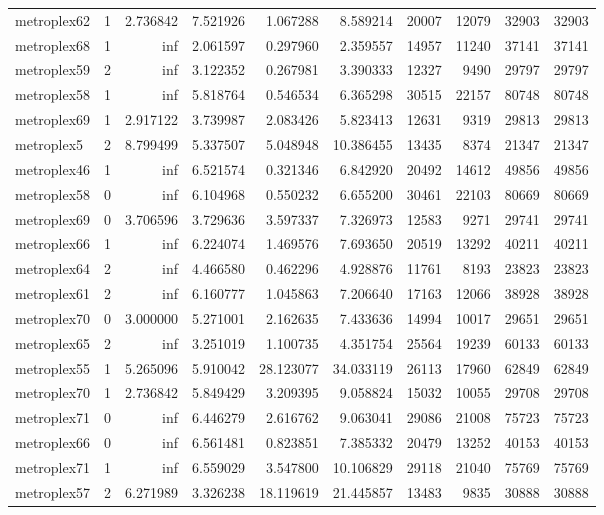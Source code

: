 \begin{longtable}{|l|r|r|r|r|r|r|r|r|r|}
metroplex62 & 1 & 2.736842 & 7.521926 & 1.067288 & 8.589214 & 20007 & 12079 & 32903 & 32903 \\
metroplex68 & 1 & inf & 2.061597 & 0.297960 & 2.359557 & 14957 & 11240 & 37141 & 37141 \\
metroplex59 & 2 & inf & 3.122352 & 0.267981 & 3.390333 & 12327 & 9490 & 29797 & 29797 \\
metroplex58 & 1 & inf & 5.818764 & 0.546534 & 6.365298 & 30515 & 22157 & 80748 & 80748 \\
metroplex69 & 1 & 2.917122 & 3.739987 & 2.083426 & 5.823413 & 12631 & 9319 & 29813 & 29813 \\
metroplex5 & 2 & 8.799499 & 5.337507 & 5.048948 & 10.386455 & 13435 & 8374 & 21347 & 21347 \\
metroplex46 & 1 & inf & 6.521574 & 0.321346 & 6.842920 & 20492 & 14612 & 49856 & 49856 \\
metroplex58 & 0 & inf & 6.104968 & 0.550232 & 6.655200 & 30461 & 22103 & 80669 & 80669 \\
metroplex69 & 0 & 3.706596 & 3.729636 & 3.597337 & 7.326973 & 12583 & 9271 & 29741 & 29741 \\
metroplex66 & 1 & inf & 6.224074 & 1.469576 & 7.693650 & 20519 & 13292 & 40211 & 40211 \\
metroplex64 & 2 & inf & 4.466580 & 0.462296 & 4.928876 & 11761 & 8193 & 23823 & 23823 \\
metroplex61 & 2 & inf & 6.160777 & 1.045863 & 7.206640 & 17163 & 12066 & 38928 & 38928 \\
metroplex70 & 0 & 3.000000 & 5.271001 & 2.162635 & 7.433636 & 14994 & 10017 & 29651 & 29651 \\
metroplex65 & 2 & inf & 3.251019 & 1.100735 & 4.351754 & 25564 & 19239 & 60133 & 60133 \\
metroplex55 & 1 & 5.265096 & 5.910042 & 28.123077 & 34.033119 & 26113 & 17960 & 62849 & 62849 \\
metroplex70 & 1 & 2.736842 & 5.849429 & 3.209395 & 9.058824 & 15032 & 10055 & 29708 & 29708 \\
metroplex71 & 0 & inf & 6.446279 & 2.616762 & 9.063041 & 29086 & 21008 & 75723 & 75723 \\
metroplex66 & 0 & inf & 6.561481 & 0.823851 & 7.385332 & 20479 & 13252 & 40153 & 40153 \\
metroplex71 & 1 & inf & 6.559029 & 3.547800 & 10.106829 & 29118 & 21040 & 75769 & 75769 \\
metroplex57 & 2 & 6.271989 & 3.326238 & 18.119619 & 21.445857 & 13483 & 9835 & 30888 & 30888 \\

\end{longtable}
